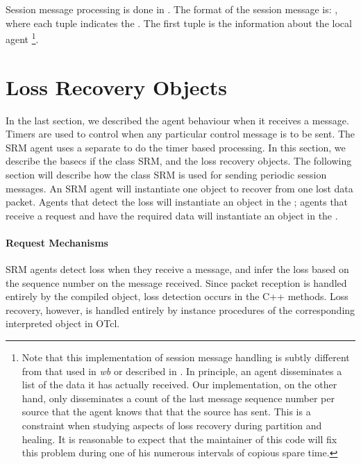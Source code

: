 {Session message processing is done in
.
The format of the session message is:
,
where each tuple indicates the
.
The first tuple is the information about the local agent%
\footnote{Note that this implementation of session message handling
  is subtly different from that used in \emph{wb} or described in
  \cite{Floy95:Reliable}.
  In principle, an agent disseminates a list of the data it has
  actually received.
  Our implementation, on the other hand, only disseminates
  a count of the last message sequence number per source that the
  agent knows that that the source has sent.
  This is a constraint when studying aspects of loss recovery
  during partition and healing.
  It is reasonable to expect that the maintainer of this code will fix
  this problem during one of his numerous intervals of copious spare time.}.

\section{Loss Recovery Objects}
\label{sec:recovery}

In the last section,
we described the agent behaviour when it receives a message.
Timers are used to control when any particular control message is to be sent.
The SRM agent uses a separate
to do the timer based processing.
In this section, we describe the basecs if the class SRM,
and the loss recovery objects.
The following section will describe how the class SRM is used 
for sending periodic session messages.
An SRM agent will instantiate one object to recover from one lost data packet.
Agents that detect the loss will instantiate an object in the
;
agents that receive a request and have the required data will
instantiate an object in the .

\paragraph{Request Mechanisms}
SRM agents detect loss when they receive a message, and
infer the loss based on the sequence number on the message received.
Since packet reception is handled entirely by the compiled object,
loss detection occurs in the C++ methods.
Loss recovery, however, is handled entirely by instance procedures
of the corresponding interpreted object in OTcl.

}
